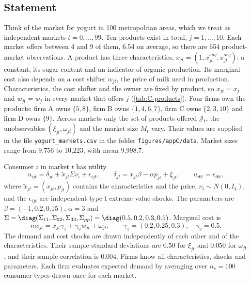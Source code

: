 \subsection{Statement}

Think of the market for yogurt in 100 metropolitan areas, which we treat as independent markets $t = 0, \dots, 99$.
Ten products exist in total, $j = 1, \dots, 10$. Each market offers between 4 and 9 of them, 6.54 on average, so there
are 654 product-market observations. A product has three characteristics,
$x_{jt} = (1, x^{sug}_{jt}, x^{org}_{jt})$: a constant, its sugar content and an indicator of organic production. Its
marginal cost also depends on a cost shifter $w_{jt}$, the price of milk used in production. Characteristics, the
cost shifter and the owner are fixed by product, so $x_{jt} = x_j$ and $w_{jt} = w_j$ in every market that offers
$j$ (\cref{tab:C-products}). Four firms own the products: firm A owns $\{5, 8\}$, firm B owns $\{1, 4, 6, 7\}$, firm C
owns $\{2, 3, 10\}$ and firm D owns $\{9\}$. Across markets only the set of products offered $\mathcal{J}_t$, the
unobservables $(\xi_{jt}, \omega_{jt})$ and the market size $M_t$ vary. Their values are supplied in the file
\texttt{yogurt\_markets.csv} in the folder \texttt{figures/appC/data}. Market sizes range from 9,756 to 10,223, with
mean 9,998.7.

Consumer $i$ in market $t$ has utility
\begin{equation}\label{eq:C-rc-utility}
  u_{ijt} = \delta_{jt} + \tilde x_{jt}\Sigma\nu_i + \epsilon_{ijt} , \qquad
  \delta_{jt} = x_{jt}\beta - \alpha p_{jt} + \xi_{jt} , \qquad
  u_{i0t} = \epsilon_{i0t} ,
\end{equation}
where $\tilde x_{jt} = (x_{jt}, p_{jt})$ contains the characteristics and the price, $\nu_i \sim N(0, I_4)$, and the
$\epsilon_{ijt}$ are independent type-I extreme value shocks. The parameters are $\beta = (-1, 0.2, 0.15)$,
$\alpha = 3$ and $\Sigma = \diag(\Sigma_{11}, \Sigma_{22}, \Sigma_{33}, \Sigma_{pp}) = \diag(0.5, 0.2, 0.3, 0.5)$.
Marginal cost is
\begin{equation}\label{eq:C-rc-mc}
  mc_{jt} = x_{jt}\gamma_1 + \gamma_2w_{jt} + \omega_{jt} , \qquad \gamma_1 = (0.2, 0.25, 0.3) , \quad \gamma_2 = 0.5 .
\end{equation}
The demand and cost shocks are drawn independently of each other and of the characteristics. Their sample standard
deviations are 0.50 for $\xi_{jt}$ and 0.050 for $\omega_{jt}$, and their sample correlation is 0.004. Firms know all
characteristics, shocks and parameters. Each firm evaluates expected demand by averaging over $n_s = 100$ consumer
types drawn once for each market.

